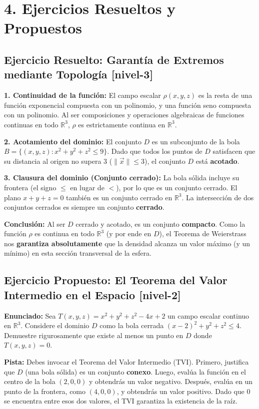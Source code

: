 \documentclass[11pt]{article}
\newenvironment{ejercicios}{%
  \section*{4. Ejercicios Resueltos y Propuestos}%
}{}
\newenvironment{ejercicioresuelto}[2]{\subsection*{Ejercicio Resuelto: #1 \small{[#2]}}}{}
\newenvironment{ejerciciopropuesto}[2]{\subsection*{Ejercicio Propuesto: #1 \small{[#2]}}}{}
\newcommand{\enunciado}[1]{\textbf{Enunciado:} #1\par\vspace{0.2cm}}
\newcommand{\pista}[1]{\textbf{Pista:} #1\par\vspace{0.4cm}}
\begin{document}
\begin{ejercicios}
\begin{ejercicioresuelto}{Garantía de Extremos mediante Topología}{nivel-3}
{      \textbf{1. Continuidad de la función:} 
      El campo escalar $\rho(x,y,z)$ es la resta de una función exponencial compuesta con un polinomio, y una función seno compuesta con un polinomio. Al ser composiciones y operaciones algebraicas de funciones continuas en todo $\mathbb{R}^3$, $\rho$ es estrictamente continua en $\mathbb{R}^3$.

      \textbf{2. Acotamiento del dominio:} 
      El conjunto $D$ es un subconjunto de la bola $B = \{ (x,y,z) \colon x^2+y^2+z^2 \le 9 \}$. Dado que todos los puntos de $D$ satisfacen que su distancia al origen no supera $3$ ($\| \vec{x} \| \le 3$), el conjunto $D$ está \textbf{acotado}.

      \textbf{3. Clausura del dominio (Conjunto cerrado):}
      La bola sólida incluye su frontera (el signo $\le$ en lugar de $<$), por lo que es un conjunto cerrado. El plano $x+y+z = 0$ también es un conjunto cerrado en $\mathbb{R}^3$. La intersección de dos conjuntos cerrados es siempre un conjunto \textbf{cerrado}. 

      \textbf{Conclusión:}
      Al ser $D$ cerrado y acotado, es un conjunto \textbf{compacto}. Como la función $\rho$ es continua en todo $\mathbb{R}^3$ (y por ende en $D$), el Teorema de Weierstrass nos \textbf{garantiza absolutamente} que la densidad alcanza un valor máximo (y un mínimo) en esta sección transversal de la esfera.
    }
  \end{ejercicioresuelto}

  \begin{ejerciciopropuesto}{El Teorema del Valor Intermedio en el Espacio}{nivel-2}
    \enunciado{
      Sea $T(x,y,z) = x^2 + y^2 + z^2 - 4x + 2$ un campo escalar continuo en $\mathbb{R}^3$. Considere el dominio $D$ como la bola cerrada $(x-2)^2 + y^2 + z^2 \le 4$. Demuestre rigurosamente que existe al menos un punto en $D$ donde $T(x,y,z) = 0$.
    }
    \pista{
      Debes invocar el Teorema del Valor Intermedio (TVI). Primero, justifica que $D$ (una bola sólida) es un conjunto \textbf{conexo}. Luego, evalúa la función en el centro de la bola $(2,0,0)$ y obtendrás un valor negativo. Después, evalúa en un punto de la frontera, como $(4,0,0)$, y obtendrás un valor positivo. Dado que $0$ se encuentra entre esos dos valores, el TVI garantiza la existencia de la raíz.
    }
  \end{ejerciciopropuesto}


\end{ejercicios}
\end{document}

